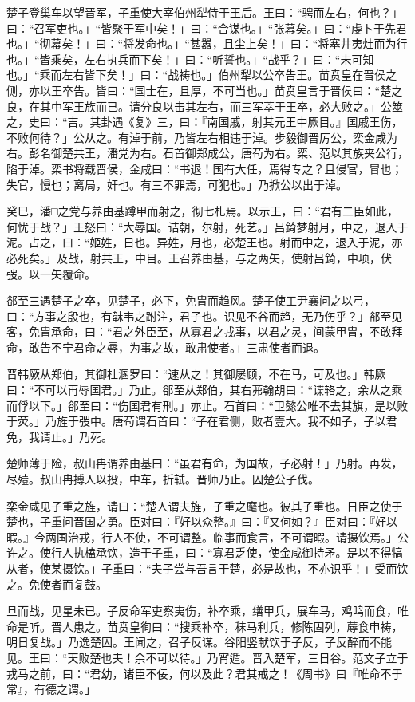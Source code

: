 \documentclass[]{article}
\begin{document}
楚子登巢车以望晋军，子重使大宰伯州犁侍于王后。王曰：``骋而左右，何也？」曰：``召军吏也。」``皆聚于军中矣！」曰：``合谋也。」``张幕矣。」曰：``虔卜于先君也。」``彻幕矣！」曰：``将发命也。」``甚嚣，且尘上矣！」曰：``将塞井夷灶而为行也。」``皆乘矣，左右执兵而下矣！」曰：``听誓也。」``战乎？」曰：``未可知也。」``乘而左右皆下矣！」曰：``战祷也。」伯州犁以公卒告王。苗贲皇在晋侯之侧，亦以王卒告。皆曰：``国士在，且厚，不可当也。」苗贲皇言于晋侯曰：``楚之良，在其中军王族而已。请分良以击其左右，而三军萃于王卒，必大败之。」公筮之，史曰：``吉。其卦遇《复》三，曰：『南国戚，射其元王中厥目。』国戚王伤，不败何待？」公从之。有淖于前，乃皆左右相违于淖。步毅御晋厉公，栾金咸为右。彭名御楚共王，潘党为右。石首御郑成公，唐苟为右。栾、范以其族夹公行，陷于淖。栾书将载晋侯，金咸曰：``书退！国有大任，焉得专之？且侵官，冒也；失官，慢也；离局，奸也。有三不罪焉，可犯也。」乃掀公以出于淖。

癸巳，潘□之党与养由基蹲甲而射之，彻七札焉。以示王，曰：``君有二臣如此，何忧于战？」王怒曰：``大辱国。诘朝，尔射，死艺。」吕錡梦射月，中之，退入于泥。占之，曰：``姬姓，日也。异姓，月也，必楚王也。射而中之，退入于泥，亦必死矣。」及战，射共王，中目。王召养由基，与之两矢，使射吕錡，中项，伏弢。以一矢覆命。

郤至三遇楚子之卒，见楚子，必下，免胄而趋风。楚子使工尹襄问之以弓，曰：``方事之殷也，有韎韦之跗注，君子也。识见不谷而趋，无乃伤乎？」郤至见客，免胄承命，曰：``君之外臣至，从寡君之戎事，以君之灵，间蒙甲胄，不敢拜命，敢告不宁君命之辱，为事之故，敢肃使者。」三肃使者而退。

晋韩厥从郑伯，其御杜溷罗曰：``速从之！其御屡顾，不在马，可及也。」韩厥曰：``不可以再辱国君。」乃止。郤至从郑伯，其右茀翰胡曰：``谍辂之，余从之乘而俘以下。」郤至曰：``伤国君有刑。」亦止。石首曰：``卫懿公唯不去其旗，是以败于荧。」乃旌于弢中。唐苟谓石首曰：``子在君侧，败者壹大。我不如子，子以君免，我请止。」乃死。

楚师薄于险，叔山冉谓养由基曰：``虽君有命，为国故，子必射！」乃射。再发，尽殪。叔山冉搏人以投，中车，折轼。晋师乃止。囚楚公子伐。

栾金咸见子重之旌，请曰：``楚人谓夫旌，子重之麾也。彼其子重也。日臣之使于楚也，子重问晋国之勇。臣对曰：『好以众整。』曰：『又何如？』臣对曰：『好以暇。』今两国治戎，行人不使，不可谓整。临事而食言，不可谓暇。请摄饮焉。」公许之。使行人执榼承饮，造于子重，曰：``寡君乏使，使金咸御持矛。是以不得犒从者，使某摄饮。」子重曰：``夫子尝与吾言于楚，必是故也，不亦识乎！」受而饮之。免使者而复鼓。

旦而战，见星未已。子反命军吏察夷伤，补卒乘，缮甲兵，展车马，鸡鸣而食，唯命是听。晋人患之。苗贲皇徇曰：``搜乘补卒，秣马利兵，修陈固列，蓐食申祷，明日复战。」乃逸楚囚。王闻之，召子反谋。谷阳竖献饮于子反，子反醉而不能见。王曰：``天败楚也夫！余不可以待。」乃宵遁。晋入楚军，三日谷。范文子立于戎马之前，曰：``君幼，诸臣不佞，何以及此？君其戒之！《周书》曰『唯命不于常』，有德之谓。」
\end{document}
